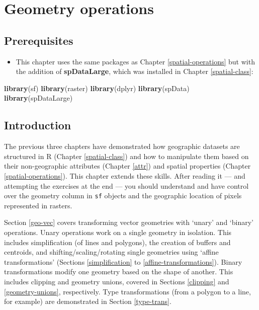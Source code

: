 \documentclass[]{krantz}
\newenvironment{Shaded}{\begin{snugshade}}{\end{snugshade}}
\newcommand{\KeywordTok}[1]{\textcolor[rgb]{0.27,0.27,0.27}{\textbf{#1}}}
\newcommand{\NormalTok}[1]{#1}
\providecommand{\tightlist}{%
  \setlength{\itemsep}{0pt}\setlength{\parskip}{0pt}}
\begin{document}
\hypertarget{geometric-operations}{%
\section{Geometry operations}\label{geometric-operations}}

\hypertarget{prerequisites-3}{%
\subsection*{Prerequisites}\label{prerequisites-3}}

\begin{itemize}
\tightlist
\item
  This chapter uses the same packages as Chapter \ref{spatial-operations} but with the addition of \textbf{spDataLarge}, which was installed in Chapter \ref{spatial-class}:
\end{itemize}

\begin{Shaded}
\begin{Highlighting}[]
\KeywordTok{library}\NormalTok{(sf)}
\KeywordTok{library}\NormalTok{(raster)}
\KeywordTok{library}\NormalTok{(dplyr)}
\KeywordTok{library}\NormalTok{(spData)}
\KeywordTok{library}\NormalTok{(spDataLarge)}
\end{Highlighting}
\end{Shaded}

\hypertarget{introduction-2}{%
\subsection{Introduction}\label{introduction-2}}

The previous three chapters have demonstrated how geographic datasets are structured in R (Chapter \ref{spatial-class}) and how to manipulate them based on their non-geographic attributes (Chapter \ref{attr}) and spatial properties (Chapter \ref{spatial-operations}).
This chapter extends these skills.
After reading it --- and attempting the exercises at the end --- you should understand and have control over the geometry column in \texttt{sf} objects and the geographic location of pixels represented in rasters.

Section \ref{geo-vec} covers transforming vector geometries with `unary' and `binary' operations.
Unary operations work on a single geometry in isolation.
This includes simplification (of lines and polygons), the creation of buffers and centroids, and shifting/scaling/rotating single geometries using `affine transformations' (Sections \ref{simplification} to \ref{affine-transformations}).
Binary transformations modify one geometry based on the shape of another.
This includes clipping and geometry unions, covered in Sections \ref{clipping} and \ref{geometry-unions}, respectively.
Type transformations (from a polygon to a line, for example) are demonstrated in Section \ref{type-trans}.
\end{document}

